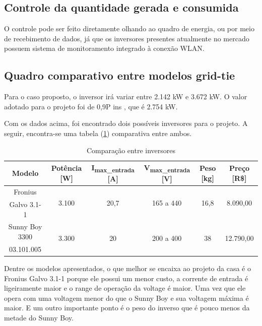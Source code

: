 \subsection{Controle da quantidade gerada e consumida}

	O controle pode ser feito diretamente olhando ao quadro de energia, ou por meio de recebimento de dados, já que os inversores presentes atualmente no mercado possuem sistema de monitoramento integrado à conexão WLAN\cite{neosolarKitGerador}.

\subsection{Quadro comparativo entre modelos grid-tie}

Para o caso proposto, o inversor irá variar entre 2.142 \si{\kilo\watt} e 3.672 \si{\kilo\watt}. O valor adotado para o projeto foi de 0,9P ins , que é 2.754 \si{\kilo\watt}.

Com os dados acima, foi encontrado dois possíveis inversores para o projeto. A seguir, encontra-se uma tabela (\ref{comparaca_inversores}) comparativa entre ambos.

\begin{table}[H]
\centering
\begin{tabular}{|c|c|c|c|c|c|}
\hline 
\textbf{Modelo} & \textbf{Potência} [\si{\watt}] & \textbf{I}\textsubscript{max\_entrada} [\si{\ampere}] & \textbf{V}\textsubscript{max\_entrada} [\si{\volt}] & \textbf{Peso} [\si{\kilo\gram}] & \textbf{Preço} [R\$]\tabularnewline
\hline 
\hline 
Fronius & \multirow{2}{*}{3.100} & \multirow{2}{*}{20,7} & \multirow{2}{*}{165 a 440} & \multirow{2}{*}{16,8} & \multirow{2}{*}{8.090,00}\tabularnewline
Galvo 3.1-1 &  &  &  &  & \tabularnewline
\hline 
Sunny Boy 3300 & \multirow{2}{*}{3.300} & \multirow{2}{*}{20} & \multirow{2}{*}{200 a 400} & \multirow{2}{*}{38} & \multirow{2}{*}{12.790,00}\tabularnewline
03.101.005 &  &  &  &  & \tabularnewline
\hline 
\end{tabular}
\caption{Comparação entre inversores}
\label{comparaca_inversores}
\end{table}

Dentre os modelos apresentados, o que melhor se encaixa ao projeto da casa é o Fronius Galvo 3.1-1 porque ele possui um menor custo, a corrente de entrada é ligeiramente maior e o range de operação da voltage é maior. Uma vez que ele opera com uma voltagem menor do que o Sunny Boy e sua voltagem máxima é maior. E um outro importante ponto é o peso do inverso que é pouco menos da metade do Sunny Boy.

